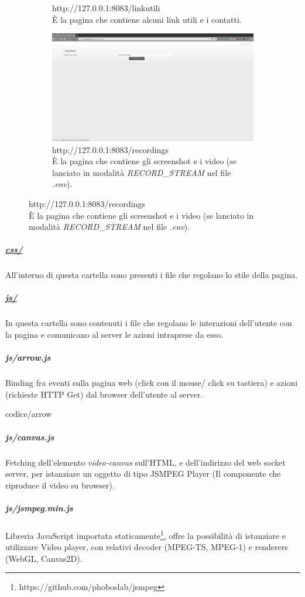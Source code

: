 \documentclass[11pt]{article}
\begin{document}
\begin{figure}[htp]
\begin{subfigure}[b]{0.5\textwidth}
		\caption{http://127.0.0.1:8083/linkutili\\È la pagina che contiene alcuni link utili e i contatti.}
		\label{fig:page-link}
	\end{subfigure}
	\begin{subfigure}[b]{0.5\textwidth}
		\includegraphics[width=\textwidth]{images/page-rec.png}
		\caption{http://127.0.0.1:8083/recordings\\	È la pagina che contiene gli screenshot e i video (se lanciato in modalità \textit{RECORD\_STREAM} nel file \textit{.env}).}
		\label{fig:page-recordings}
	\end{subfigure}
\end{figure}
\newpage
\subparagraph{\underline{css/}}
All'interno di questa cartella sono presenti i file che regolano lo stile della pagina.
\subparagraph{\underline{js/}}
In questa cartella sono contenuti i file che regolano le interazioni dell'utente con la pagina e comunicano al server le azioni intraprese da esso.
\subparagraph{js/arrow.js}
Binding fra eventi sulla pagina web (click con il mouse/ click su tastiera) e azioni (richieste HTTP Get) dal browser dell'utente al server.
\begin{lstinputlisting}[caption={js/arrow.js},basicstyle=\tiny]{codice/arrow}
\end{lstinputlisting}
\subparagraph{js/canvas.js}
Fetching dell'elemento \textit{video-canvas} sull'HTML, e dell'indirizzo del web socket server, per istanziare un oggetto di tipo JSMPEG Player (Il componente che riproduce il video su browser).
\subparagraph{js/jsmpeg.min.js}
Libreria JavaScript importata staticamente\footnote{https://github.com/phoboslab/jsmpeg}, offre la possibilità di istanziare e utilizzare Video player, con relativi decoder (MPEG-TS, MPEG-1)  e renderers (WebGL, Canvas2D).
\end{document}
